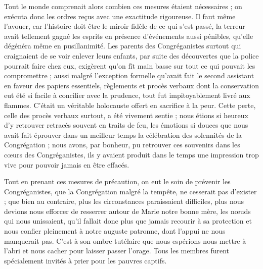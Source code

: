 Tout le monde comprenait alors combien ces mesures étaient nécessaires ; on exécuta donc les ordres reçus avec une exactitude rigoureuse. Il faut même l'avouer, car l'histoire doit être le miroir fidèle de ce qui s'est passé, la terreur avait tellement gagné les esprits en présence d'événements aussi pénibles, qu'elle dégénéra même en pusillanimité. Les parents des Congréganistes surtout qui craignaient de se voir enlever leurs enfants, par suite des découvertes que la police pourrait faire chez eux,
exigèrent qu'on fît main basse sur tout ce qui pouvait les compromettre ; aussi malgré l'exception formelle qu'avait fait le second assistant en faveur des papiers essentiels, règlements et procès verbaux dont la conservation eut été si facile à concilier avec la prudence, tout fut impitoyablement livré aux flammes. C'était un véritable holocauste offert en sacrifice à la peur. Cette perte, celle des procès verbaux surtout, a été vivement sentie ; nous étions si heureux d'y retrouver retracés souvent en traits de feu, les émotions si douces que nous avait fait éprouver dans un meilleur temps la célébration des solennités de la Congrégation ; nous avons, par bonheur, pu retrouver ces souvenirs dans les cœurs des Congréganistes, ils y avaient produit dans le temps une impression trop vive pour pouvoir jamais en être effacés.

Tout en prenant ces mesures de précaution, on eut le soin de prévenir les Congréganistes, que la Congrégation malgré la tempête, ne cesserait pas d'exister ; que bien au contraire, plus les circonstances paraissaient difficiles, plus nous devions nous efforcer de resserrer autour de Marie notre bonne mère, les nœuds qui nous unissaient, qu'il fallait donc plus que jamais recourir à sa protection et nous confier pleinement à notre auguste patronne, dont l'appui ne nous manquerait pas. C'est à son ombre tutélaire que nous espérions nous mettre à l'abri et nous cacher pour laisser passer l'orage. Tous les membres furent spécialement invités à prier pour les pauvres captifs.

